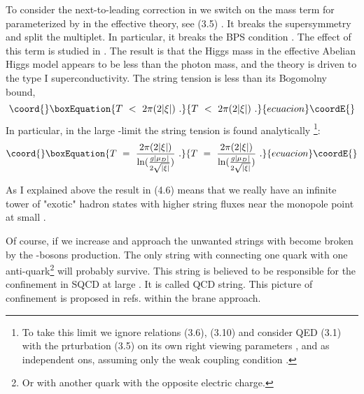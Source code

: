 \documentclass[a4paper,12pt]{article}
\begin{document}
To consider the next-to-leading correction in \myHighlight{$\mu /\Lambda$}\coordHE{}
we switch on   the mass
term for \coordHE{}  parameterized by \coordHE{}
in the effective theory, see (3.5)
. It breaks the \coordHE{} supersymmetry and
split the \coordHE{} multiplet. In particular, it breaks the
BPS condition \coordHE{}. The effect of this term is studied
in \cite{VY}. The result is that the Higgs mass in the effective
Abelian Higgs model appears to be less than the photon mass,
\coordHE{} and the theory is driven to the type I
superconductivity. The string tension is less than its Bogomolny
bound,
\begin{equation}\coord{}\boxEquation{
T\ <\ 2\pi(2|\xi|)\ .
}{
T\ <\ 2\pi(2|\xi|)\ .
}{ecuacion}\coordE{}\end{equation}
In particular, in the large \coordHE{}-limit \coordHE{} the string
tension is found analytically \footnote{To  take this limit
 we ignore relations (3.6), (3.10) and 
consider  QED (3.1) with the prturbation (3.5)
on its own right viewing parameters  \myHighlight{$\xi$}\coordHE{} , \coordHE{} and \coordHE{}
as independent ons, assuming only the weak coupling condition
\coordHE{}\cite{VY}.}\cite{VY}:
\begin{equation}\coord{}\boxEquation{
T\ =\ \frac{2\pi(2|\xi|)}{\ln(\frac{g |\mu_{D}|}{2\sqrt{|\xi|}})}\ .
}{
T\ =\ \frac{2\pi(2|\xi|)}{\ln(\frac{g |\mu_{D}|}{2\sqrt{|\xi|}})}\ .
}{ecuacion}\coordE{}\end{equation}

As I explained above
the result in (4.6) means that we really have an infinite tower of
"exotic" hadron states with higher string fluxes near the
monopole point at small \myHighlight{$\mu $}\coordHE{}.

Of course, if we increase \myHighlight{$\mu $}\coordHE{} and approach
\myHighlight{$\mu \sim\Lambda$}\coordHE{}  the unwanted strings with \coordHE{} become
broken by the \coordHE{}-bosons production. The only string with \coordHE{}
connecting one quark with one anti-quark\footnote{Or with another
quark with the opposite electric charge.} will probably survive.
This string is believed to be responsible for the confinement in
\coordHE{} SQCD at large \myHighlight{$\mu $}\coordHE{} .
It is called QCD string. This picture of confinement is proposed
in refs.\cite{W,HSZ}
 within the brane approach.
\end{document}
